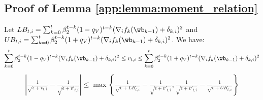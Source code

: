 \documentclass[11pt, letterpaper]{article}
\begin{document}
\subsection{Proof of Lemma \ref{app:lemma:moment_relation}}
\begin{lemma}
\label{app:lemma:moment_relation}
Let $LB_{t,i} = \sum_{k=0}^t\beta_2^{t-k}(1-q_V)^{t-k}(\nabla_i f_k(\wb_{k-1}) + \delta_{k,i})^2$ and $UB_{t,i} = \sum_{k=0}^t\beta_2^{t-k}(1+q_V)^{t-k}(\nabla_i f_k(\wb_{k-1}) + \delta_{k,i})^2$. We have:
\begin{align}
    \sum_{k=0}^t\beta_2^{t-k}(1-q_V)^{t-k}(\nabla_i f_k(\wb_{k-1}) + \delta_{k,i})^2 \le v_{t, i} \le \sum_{k=0}^t\beta_2^{t-k}(1+q_V)^{t-k}(\nabla_i f_k(\wb_{k-1}) + \delta_{k,i})^2
\end{align}
\begin{align}
    \left|\frac{1}{\sqrt{\epsilon+v_{t,i}}}-\frac{1}{\sqrt{\epsilon+v'_{t,i}}}\right| \le \max\left\{ \frac{1}{\sqrt{\epsilon+LB_{t,i}}} - \frac{1}{\sqrt{\epsilon+v'_{t,i}}}, \frac{1}{\sqrt{\epsilon+v'_{t,i}}} - \frac{1}{\sqrt{\epsilon+UB_{t,i}}} \right\}
\end{align}
\end{lemma}
\end{document}
